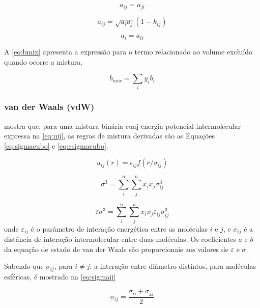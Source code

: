 \begin{equation}\label{eq:aij2}
a_{ij} = a_{ji}
\end{equation}

\begin{equation}\label{eq:aij3}
a_{ij} = \sqrt{a_ia_j}(1 - k_{ij})
\end{equation}

\begin{equation}\label{eq:aij4}
a_{i} = a_{ii}
\end{equation}

A \autoref{eq:bmix} apresenta a expressão para o termo relacionado ao volume
excluído quando ocorre a mistura.

\begin{equation}\label{eq:bmix}
b_{mix} = \sum_iy_ib_i
\end{equation}

\subsubsection{van der Waals (vdW)}
 mostra que, para uma mistura binária cuaj energia potencial
intermolecular expressa na \autoref{eq:uij}, as regras de mistura derivadas são 
as Equações \ref{eq:sigmacubo} e \ref{eq:esigmacubo}.

\begin{equation}\label{eq:uij}
u_{ij}(r) = \epsilon_{ij}f(r/\sigma_{ij})
\end{equation}

\begin{equation}\label{eq:sigmacubo}
\sigma^3 = \sum_i^n\sum_j^nx_ix_j\sigma_{ij}^3
\end{equation}

\begin{equation}\label{eq:esigmacubo}
\varepsilon\sigma^3 = \sum_i^n\sum_j^nx_ix_j\varepsilon_{ij}\sigma_{ij}^3
\end{equation}
onde $\varepsilon_{ij}$ é o parâmetro de interação energética entre as moléculas
$i$ e $j$, e $\sigma_{ij}$ é a distância de interação intermolecular entre duas
moléculas. Os coeficientes $a$ e $b$ da equação de estado de van der Waals são
proporcionais aos valores de $\varepsilon$ e $\sigma$.

Sabendo que $\sigma_{ij}$, para $i \neq j$, a interação entre diâmetro
distintos, para moléculas esféricas, é mostrado na \autoref{eq:sigmaij}

\begin{equation}\label{eq:sigmaij}
\sigma_{ij} = \frac{\sigma_{ii} + \sigma_{jj}}{2}
\end{equation}

